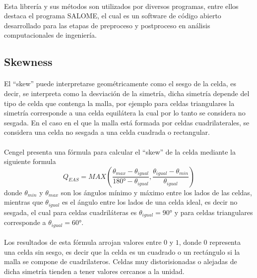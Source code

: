 \documentclass[letterpaper, openright, 12pt]{book}
\begin{document}
    \paragraph*{}
    Esta librería y sus métodos son utilizados por diversos programas, entre
    ellos destaca el programa SALOME, el cual es un software de código
    abierto desarrollado para las etapas de preproceso y postproceso en
    análisis computacionales de ingeniería.

    \subsection{Skewness}
    \paragraph*{}
    El ``skew'' puede interpretarse geométricamente como el sesgo de la celda,
    es decir, se interpreta como la desviación de la simetría, dicha simetría
    depende del tipo de celda que contenga la malla, por ejemplo para celdas
    triangulares la simetría corresponde a una celda equilátera la cual por lo
    tanto se considera no sesgada. En el caso en el que la malla está formada
    por celdas cuadrilaterales, se considera una celda no sesgada a una celda
    cuadrada o rectangular.

    \paragraph*{}
    Cengel \cite{cengel} presenta una fórmula para calcular el ``skew'' de la
    celda mediante la siguiente formula
    \begin{equation}
      Q_{EAS} = MAX \left(
      \frac{\theta_{max} - \theta_{igual}}{180\si{\degree} - \theta_{igual}},
      \frac{\theta_{igual} - \theta_{min}}{\theta_{igual}}
      \right)
    \end{equation}
    donde $\theta_{min}$ y $\theta_{max}$ son los ángulos mínimo y máximo entre
    los lados de las celdas, mientras que $\theta_{igual}$ es el ángulo entre
    los lados de una celda ideal, es decir no sesgada, el cual para celdas
    cuadriláteras es $\theta_{igual} = 90\si{\degree}$ y para celdas
    triangulares corresponde a $\theta_{igual} = 60\si{\degree}$.

    \paragraph*{}
    Los resultados de esta fórmula arrojan valores entre $0$ y $1$, donde $0$
    representa una celda sin sesgo, es decir que la celda es un cuadrado o un
    rectángulo si la malla se compone de cuadrilateros. Celdas muy
    distorisionadas o alejadas de dicha simetría tienden a tener valores
    cercanos a la unidad.
\end{document}
